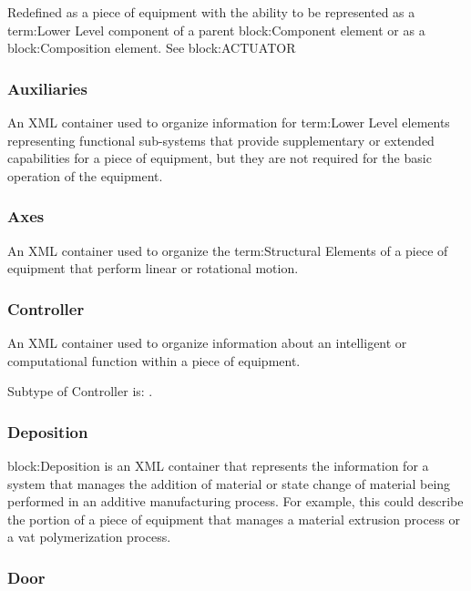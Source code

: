 Redefined as a piece of equipment with the ability to be represented as a {term:Lower Level} component of a parent {block:Component} element or as a {block:Composition} element. See {block:ACTUATOR}

\FloatBarrier

\subsubsection{Auxiliaries}
  \label{sec:Auxiliaries}


An XML container used to organize information for {term:Lower Level} elements representing functional sub-systems that provide supplementary or extended capabilities for a piece of equipment, but they are not required for the basic operation of the equipment.

\FloatBarrier

\subsubsection{Axes}
  \label{sec:Axes}


An XML container used to organize the {term:Structural Elements} of a piece of equipment that perform linear or rotational motion.

\FloatBarrier

\subsubsection{Controller}
  \label{sec:Controller}


An XML container used to organize information about an intelligent or computational function within a piece of equipment.


Subtype of Controller is: .
\FloatBarrier

\subsubsection{Deposition}
  \label{sec:Deposition}


{block:Deposition} is an XML container that represents the information for a system that manages the addition of material or state change of material being performed in an additive manufacturing process.  For example, this could describe the portion of a piece of equipment that manages a material extrusion process or a vat polymerization process.

\FloatBarrier

\subsubsection{Door}
  \label{sec:Door}


